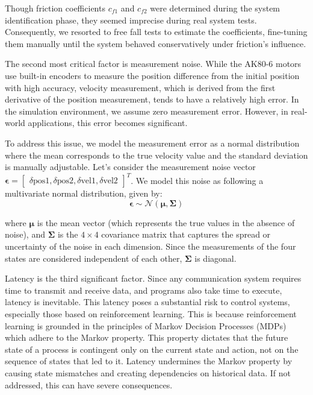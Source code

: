 Though friction coefficients \( c_{f1} \) and \( c_{f2} \) were determined during the system identification phase, they seemed imprecise during real system tests. Consequently, we resorted to free fall tests to estimate the coefficients, fine-tuning them manually until the system behaved conservatively under friction's influence.

The second most critical factor is measurement noise. While the AK80-6 motors use built-in encoders to measure the position difference from the initial position with high accuracy, velocity measurement, which is derived from the first derivative of the position measurement, tends to have a relatively high error. In the simulation environment, we assume zero measurement error. However, in real-world applications, this error becomes significant.

To address this issue, we model the measurement error as a normal distribution where the mean corresponds to the true velocity value and the standard deviation is manually adjustable. Let's consider the measurement noise vector \(\boldsymbol{\epsilon} = 
\begin{bmatrix}
\delta\text{pos1},
\delta\text{pos2},
\delta\text{vel1},
\delta\text{vel2}
\end{bmatrix}^T\). We model this noise as following a multivariate normal distribution, given by:
\begin{equation}
\boldsymbol{\epsilon} \sim \mathcal{N}(\boldsymbol{\mu}, \boldsymbol{\Sigma})
\end{equation}

where \(\boldsymbol{\mu}\) is the mean vector (which represents the true values in the absence of noise), and \(\boldsymbol{\Sigma}\) is the \(4 \times 4\) covariance matrix that captures the spread or uncertainty of the noise in each dimension. Since the measurements of the four states are considered independent of each other, \(\boldsymbol{\Sigma}\) is diagonal.

Latency is the third significant factor. Since any communication system requires time to transmit and receive data, and programs also take time to execute, latency is inevitable. This latency poses a substantial risk to control systems, especially those based on reinforcement learning. This is because reinforcement learning is grounded in the principles of Markov Decision Processes (MDPs) which adhere to the Markov property. This property dictates that the future state of a process is contingent only on the current state and action, not on the sequence of states that led to it. Latency undermines the Markov property by causing state mismatches and creating dependencies on historical data. If not addressed, this can have severe consequences.

